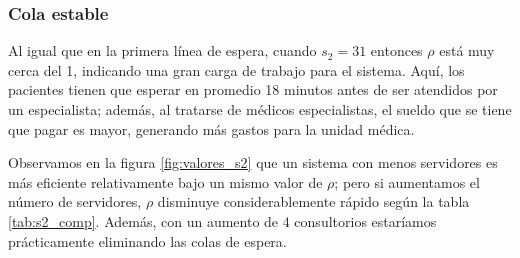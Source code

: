 \documentclass[10pt]{article}
\begin{document}
    \subsubsection{Cola estable}
    Al igual que en la primera línea de espera, cuando $s_{2} = 31$ entonces $\rho$ está muy cerca del 1, indicando una gran carga de trabajo para el sistema. Aquí, los pacientes tienen que esperar en promedio 18 minutos antes de ser atendidos por un especialista; además, al tratarse de médicos especialistas, el sueldo que se tiene que pagar es mayor, generando más gastos para la unidad médica.
    
    Observamos en la figura \ref{fig:valores_s2} que un sistema con menos servidores es más eficiente relativamente bajo un mismo valor de $\rho$; pero si aumentamos el número de servidores, $\rho$ disminuye considerablemente rápido según la tabla \ref{tab:s2_comp}. Además, con un aumento de $4$ consultorios estaríamos prácticamente eliminando las colas de espera.
    
\end{document}
